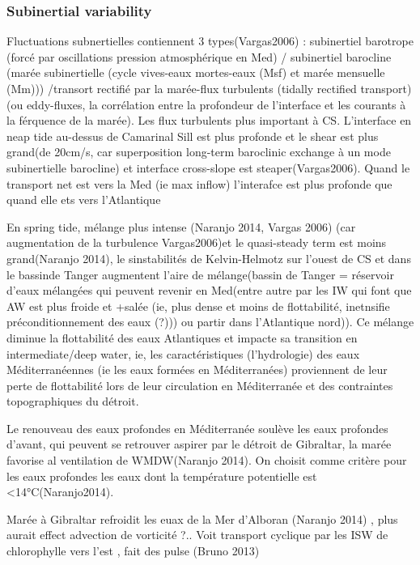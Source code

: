\subsubsection{Subinertial variability}
Fluctuations subnertielles contiennent 3 types(Vargas2006) : subinertiel barotrope (forcé par oscillations pression atmosphérique en Med) / subinertiel barocline (marée subinertielle (cycle vives-eaux mortes-eaux (Msf) et marée mensuelle (Mm))) /transort rectifié par la marée-flux turbulents (tidally rectified transport) (ou eddy-fluxes, la corrélation entre la profondeur de l’interface et les courants à la férquence de la marée). Les flux turbulents plus important à CS.
L’interface en neap tide au-dessus de Camarinal Sill est plus profonde et le shear est plus grand(de 20cm/s, car superposition long-term baroclinic exchange à un mode subinertielle barocline) et interface cross-slope est steaper(Vargas2006). Quand le transport net est vers la Med (ie max inflow) l’interafce est plus profonde que quand elle ets vers l’Atlantique




En spring tide, mélange plus intense (Naranjo 2014, Vargas 2006) (car augmentation de la turbulence Vargas2006)et le quasi-steady term est moins grand(Naranjo 2014), le sinstabilités de Kelvin-Helmotz sur l’ouest de CS et dans le bassinde Tanger augmentent l’aire de mélange(bassin de Tanger = réservoir d’eaux mélangées qui peuvent revenir en Med(entre autre par les IW qui font que AW est plus froide et +salée (ie, plus dense et moins de flottabilité, inetnsifie préconditionnement des eaux (?))) ou partir dans l’Atlantique nord)). Ce mélange diminue la flottabilité des eaux Atlantiques et impacte sa transition en intermediate/deep water, ie, les caractéristiques (l’hydrologie) des eaux Méditerranéennes (ie les eaux formées en Méditerranées) proviennent de leur perte de flottabilité lors de leur circulation en Méditerranée et des contraintes topographiques du détroit.



Le renouveau des eaux profondes en Méditerranée soulève les eaux profondes d’avant, qui peuvent se retrouver aspirer par le détroit de Gibraltar, la marée favorise al ventilation de WMDW(Naranjo 2014). On choisit comme critère pour les eaux profondes les eaux dont la température potentielle est <14°C(Naranjo2014).

Marée à Gibraltar refroidit les euax de la Mer d’Alboran (Naranjo 2014) , plus aurait effect advection de vorticité ?.. Voit transport cyclique par les ISW de chlorophylle vers l’est , fait des pulse (Bruno 2013)


